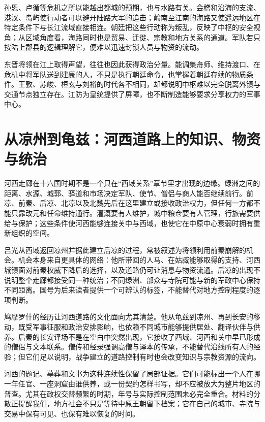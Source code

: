 孙恩、卢循等危机之所以能越出都城的预期，也与水路有关。会稽和沿海的支流、港汊、岛屿使行动者可以避开陆路大军的追击；岭南至江南的海路又使遥远地区在特定条件下与长江流域直接相连。朝廷把这些行动称为叛乱，反映了中枢的安全视角；从区域角度看，海路同时也是贸易、迁徙、宗教和地方关系的通道。军队若只按陆上郡县的逻辑理解它，便难以迅速封锁人员与物资的流动。

东晋将领在江上取得声望，往往也因此获得政治分量。能调集舟师、维持渡口、在危机中将军队送到建康的人，不只是执行朝廷命令，也掌握着朝廷存续的物质条件。王敦、苏峻、桓玄与刘裕的时代各不相同，却都说明中枢难以完全脱离外镇与交通节点独立存在。江防为皇统提供了屏障，也不断制造能够要求分享权力的军事中心。

\section{从凉州到龟兹：河西道路上的知识、物资与统治}
\label{sec:eastern-jin-depth-hexicorridor}

河西走廊在十六国时期不是一个只在“西域关系”章节里才出现的边缘。绿洲之间的距离、水源、城郭、驿道和市场决定军队、使节、僧侣与商人能否继续前行。前凉、前秦、后凉、北凉以及北魏先后在这里建立或接收政治权力，但任何一方都不能只靠改元和任命维持通行。灌溉要有人维护，城中粮仓要有人管理，行旅需要供给与保护；这些条件使河西能够连接关中与西域，也使它在中原中心衰弱时拥有重新组织的空间。

吕光从西域返回凉州并据此建立后凉的过程，常被叙述为将领利用前秦崩解的机会。机会本身来自更具体的网络：他所带回的人马、在姑臧能够取得的支持、河西城镇面对前秦权威下降后的选择，以及道路仍可让消息与物资流通。后凉的出现不说明整个走廊都接受同一种统治；不同绿洲、部众与寺院可能与新的军政中心保持不同距离。国号为后来读者提供一个可辨认的标签，不能替代对地方控制程度的逐项判断。

鸠摩罗什的经历让河西道路的文化面向尤其清楚。他从龟兹到凉州、再到长安的移动，既受军事征服和政治安排影响，也依赖不同城市能够提供居处、翻译伙伴与供养。后秦的长安译场不是在空白中突然出现，它接收了西域、河西和关中早已形成的僧侣与文本联系。僧传和经录强调高僧与译本的传承，不能替代沿线所有人的经验；但它们足以说明，战争建立的道路控制有时也会改变知识与宗教资源的流向。

河西的题记、墓葬和文书为这种连续性保留了局部证据。它们可能标出一个人在哪一年任官、一座洞窟由谁供养，或一份契约怎样书写，却不应被放大为整片地区的普查。尤其在政权交替频繁的时期，年号与实际控制范围未必完全重合。材料的分散正提醒我们，地方社会不只是等待中原王朝留下档案；它在自己的城市、寺院与交易中保有可见、也保有难以恢复的时间。

